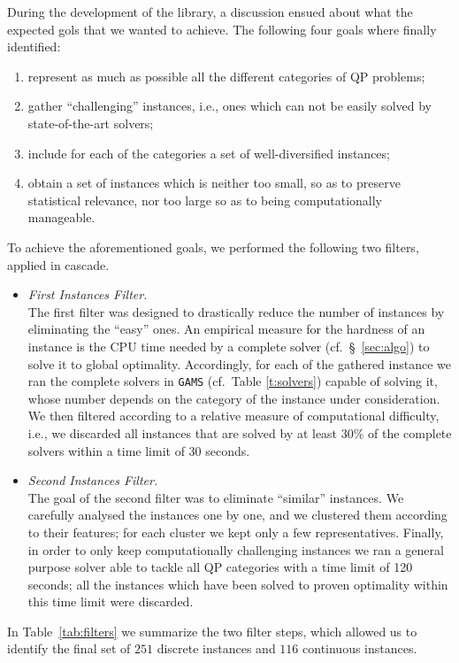 During the development of the library, a discussion ensued about what
the expected gols that we wanted to achieve. The following four goals
where finally identified:
%
\begin{enumerate}
 \item represent as much as possible all the different categories of QP
       problems;
 \item gather ``challenging'' instances, i.e., ones which can not be easily
       solved by  state-of-the-art solvers;
 \item include for each of the categories a set of well-diversified
       instances;
 \item obtain a set of instances which is neither too small, so as to
       preserve statistical relevance, nor too large so as to being
       computationally manageable.
\end{enumerate}
%
To achieve the aforementioned goals, we performed the following two
filters, applied in cascade.
%
\begin{itemize}
 \item \emph{First Instances Filter.}\\
       The first filter was designed to drastically reduce the number of
       instances by eliminating the ``easy'' ones. An empirical measure
       for the hardness of an instance is the CPU time needed by a
       complete solver (cf.~\S~\ref{sec:algo}) to solve it to
       global optimality. Accordingly, for each of the gathered instance we
       ran the complete solvers in {\tt GAMS} (cf.~Table \ref{t:solvers})
       capable of solving it, whose number depends on the category of the
       instance under consideration. We then filtered according to a relative
       measure of computational difficulty, i.e., we discarded all instances
       that are solved by at least 30\% of the complete solvers within a time
       limit of 30 seconds.
 \item \emph{Second Instances Filter.}\\
       The goal of the second filter was to eliminate ``similar'' instances.
       We carefully analysed the instances one by one, and we clustered them
       according to their features; for each cluster we kept only a few
       representatives. Finally, in order to only
       keep computationally challenging instances we ran a general purpose solver
       able to tackle all QP categories with a time limit of 120 seconds; all the
       instances which have been solved to proven optimality within this time limit
       were discarded.
\end{itemize}
%
In Table~\ref{tab:filters} we summarize the two filter steps, which
allowed us to identify the final set of $251$ discrete instances and
$116$ continuous instances.

